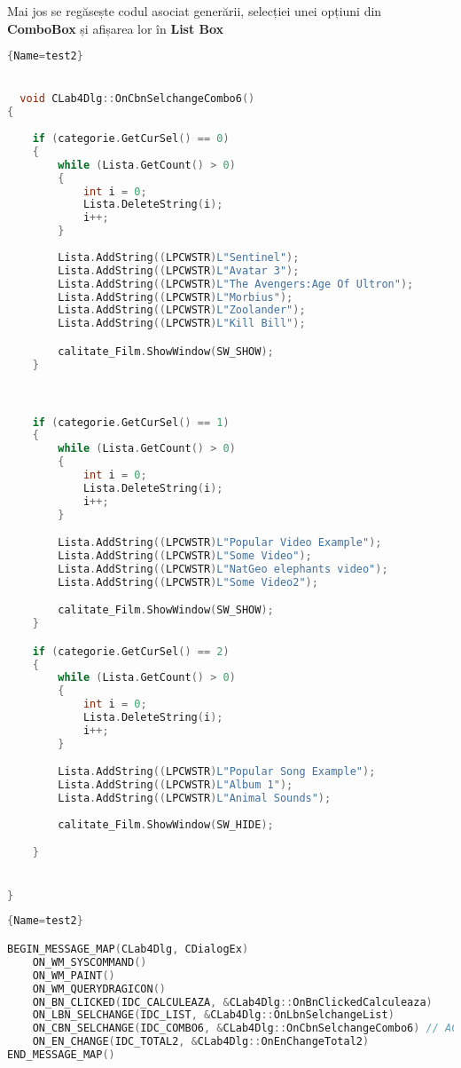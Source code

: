 \documentclass{amsart}
\begin{document}
\hfill \newline
\hfill \newline
 Mai jos se regăsește codul asociat generării, selecției unei opțiuni din \textbf{ComboBox} și afișarea lor în \textbf{List Box}  


\begin{lstlisting}[language=C++]{Name=test2}


  void CLab4Dlg::OnCbnSelchangeCombo6()
{
    
	if (categorie.GetCurSel() == 0)
	{
		while (Lista.GetCount() > 0)
		{
			int i = 0;
			Lista.DeleteString(i);
			i++;
		}
        
		Lista.AddString((LPCWSTR)L"Sentinel");
		Lista.AddString((LPCWSTR)L"Avatar 3");
		Lista.AddString((LPCWSTR)L"The Avengers:Age Of Ultron");
		Lista.AddString((LPCWSTR)L"Morbius");
		Lista.AddString((LPCWSTR)L"Zoolander");
		Lista.AddString((LPCWSTR)L"Kill Bill");

		calitate_Film.ShowWindow(SW_SHOW);
	}



	if (categorie.GetCurSel() == 1)
	{
		while (Lista.GetCount() > 0)
		{
			int i = 0;
			Lista.DeleteString(i);
			i++;
		}

		Lista.AddString((LPCWSTR)L"Popular Video Example");
		Lista.AddString((LPCWSTR)L"Some Video");
		Lista.AddString((LPCWSTR)L"NatGeo elephants video");
		Lista.AddString((LPCWSTR)L"Some Video2");

		calitate_Film.ShowWindow(SW_SHOW);
	}

	if (categorie.GetCurSel() == 2)
	{
		while (Lista.GetCount() > 0)
		{
			int i = 0;
			Lista.DeleteString(i);
			i++;
		}

		Lista.AddString((LPCWSTR)L"Popular Song Example");
		Lista.AddString((LPCWSTR)L"Album 1");
		Lista.AddString((LPCWSTR)L"Animal Sounds");
		
		calitate_Film.ShowWindow(SW_HIDE);

	}


}
 \end{lstlisting}


 \begin{lstlisting}[language=C++]{Name=test2}

BEGIN_MESSAGE_MAP(CLab4Dlg, CDialogEx)
	ON_WM_SYSCOMMAND()
	ON_WM_PAINT()
	ON_WM_QUERYDRAGICON()
	ON_BN_CLICKED(IDC_CALCULEAZA, &CLab4Dlg::OnBnClickedCalculeaza)
	ON_LBN_SELCHANGE(IDC_LIST, &CLab4Dlg::OnLbnSelchangeList)
	ON_CBN_SELCHANGE(IDC_COMBO6, &CLab4Dlg::OnCbnSelchangeCombo6) // ACESTA
	ON_EN_CHANGE(IDC_TOTAL2, &CLab4Dlg::OnEnChangeTotal2)
END_MESSAGE_MAP()

 \end{lstlisting}
\end{document}
